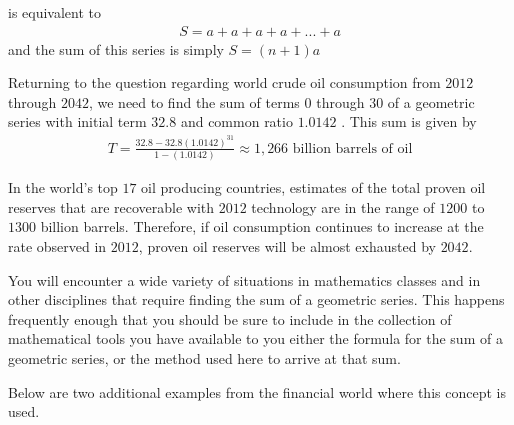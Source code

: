 \documentclass[10pt,]{book}
\theoremstyle{plain}
\theoremstyle{definition}
\theoremstyle{definition}
\theoremstyle{definition}
\numberwithin{equation}{section}
\begin{document}
is equivalent to%
\begin{gather*}
S = a + a + a + a + ... + a
\end{gather*}
and the sum of this series is simply \(S=(n+1)a\)%
\par
\hypertarget{p-148}{}%
Returning to the question regarding world crude oil consumption from \(2012\) through \(2042\), we need to find the sum of terms \(0\) through \(30\) of a geometric series with initial term \(32.8\) and common ratio \(1.0142\) .  This sum is given by%
\begin{gather*}
T = \frac{32.8-32.8(1.0142)^{31}}{1-(1.0142)} \approx 1,266 \text{ billion barrels of oil} 
\end{gather*}
%
\par
\hypertarget{p-149}{}%
In the world’s top \(17\) oil producing countries, estimates of the total proven oil reserves that are recoverable with \(2012\) technology are in the range of \(1200\) to \(1300\) billion barrels.  Therefore, if oil consumption continues to increase at the rate observed in \(2012\), proven oil reserves will be almost exhausted by \(2042\).%
\par
\hypertarget{p-150}{}%
You will encounter a wide variety of situations in mathematics classes and in other disciplines that require finding the sum of a geometric series. This happens frequently enough that you should be sure to include in the collection of mathematical tools you have available to you either the formula for the sum of a geometric series, or the method used here to arrive at that sum.%
\par
\hypertarget{p-151}{}%
Below are two additional examples from the financial world where this concept is used.%
\end{document}
